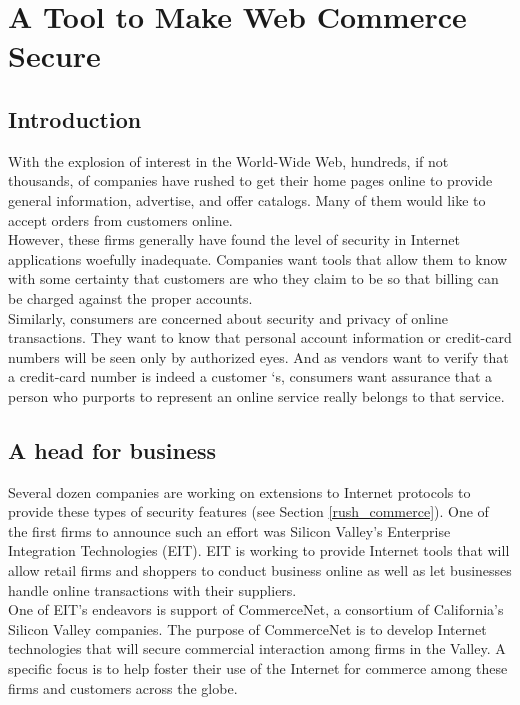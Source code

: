 \section{A Tool to Make Web Commerce Secure}
\label{tool_commerce}

\subsection{Introduction}
With the explosion of interest in the World-Wide Web, hundreds, if not
thousands, of companies have rushed to get their home pages online to
provide general information, advertise, and offer catalogs. Many of
them would like to accept orders from customers online.\\

However, these firms generally have found the level of security in Internet
applications woefully inadequate. Companies want tools that allow them to
know with some certainty that customers are who they
claim to be so that billing can be charged against the proper accounts.\\

Similarly, consumers are concerned about security and privacy of online
transactions. They want to know that personal account information or
credit-card numbers will be seen only by authorized eyes. And as
vendors want to verify that a credit-card number is indeed a customer
`s, consumers want assurance that a person who purports to represent an
online service really belongs to that service.

\subsection{A head for business}
Several dozen companies are working on extensions to Internet protocols to
provide these types of security features (see Section \ref{rush_commerce}).
One of the first firms to announce such an effort was Silicon Valley's
Enterprise Integration Technologies (EIT).  EIT is working to provide
Internet tools that will allow retail firms and shoppers to conduct
business online as well as let businesses handle online transactions with
their suppliers.\\

One of EIT's endeavors is support of CommerceNet, a consortium of
California's Silicon Valley companies. The purpose of CommerceNet is to
develop Internet technologies that will secure commercial interaction
among firms in the Valley. A specific focus is to help foster their use
of the Internet for commerce among these firms and customers across the
globe.\\


